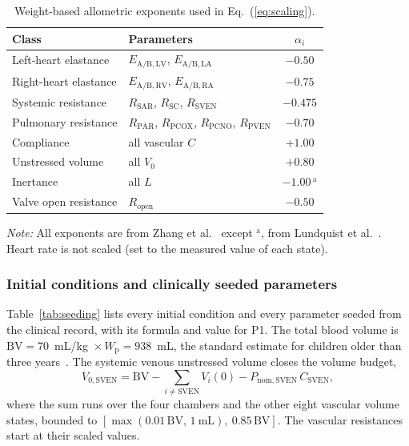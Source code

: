 \begin{table}[!htbp]
\centering\small
\caption{Weight-based allometric exponents used in Eq.~(\ref{eq:scaling}).}
\label{tab:exponents}
\begin{tabular}{llc}
\toprule
\textbf{Class} & \textbf{Parameters} & $\alpha_i$ \\
\midrule
Left-heart elastance & $E_{\mathrm{A/B,LV}}$, $E_{\mathrm{A/B,LA}}$ & $-0.50$ \\
Right-heart elastance & $E_{\mathrm{A/B,RV}}$, $E_{\mathrm{A/B,RA}}$ & $-0.75$ \\
Systemic resistance & $R_{\mathrm{SAR}}$, $R_{\mathrm{SC}}$, $R_{\mathrm{SVEN}}$ & $-0.475$ \\
Pulmonary resistance & $R_{\mathrm{PAR}}$, $R_{\mathrm{PCOX}}$, $R_{\mathrm{PCNO}}$, $R_{\mathrm{PVEN}}$ & $-0.70$ \\
Compliance & all vascular $C$ & $+1.00$ \\
Unstressed volume & all $V_0$ & $+0.80$ \\
Inertance & all $L$ & $-1.00$\,$^{\mathrm{a}}$ \\
Valve open resistance & $R_{\mathrm{open}}$ & $-0.50$ \\
\bottomrule
\end{tabular}
\par\vspace{2pt}
\begin{minipage}{0.8\linewidth}
\raggedright\footnotesize
\emph{Note:} All exponents are from Zhang et al.~\cite{zhang2019multiscale} except $^{\mathrm{a}}$, from Lundquist et al.~\cite{Lundquist2025}. Heart rate is not scaled (set to the measured value of each state).
\end{minipage}
\end{table}

\subsubsection{Initial conditions and clinically seeded parameters}
Table~\ref{tab:seeding} lists every initial condition and every parameter seeded from the clinical record, with its formula and value for P1. The total blood volume is $\mathrm{BV} = 70$~mL/kg~$\times\,W_{\mathrm{p}} = 938$~mL, the standard estimate for children older than three years~\cite{Cote2024}. The systemic venous unstressed volume closes the volume budget,
\begin{equation}
V_{0,\mathrm{SVEN}} = \mathrm{BV} - \sum_{i \neq \mathrm{SVEN}} V_i(0) - P_{\mathrm{nom,SVEN}}\,C_{\mathrm{SVEN}},
\label{eq:sven}
\end{equation}
where the sum runs over the four chambers and the other eight vascular volume states, bounded to $[\max(0.01\,\mathrm{BV},\,1~\mathrm{mL}),\ 0.85\,\mathrm{BV}]$. The vascular resistances start at their scaled values.

